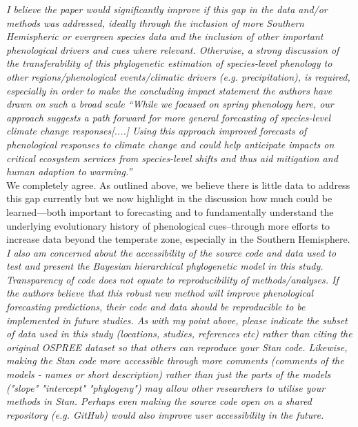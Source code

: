 \documentclass[11pt]{article}
\begin{document}
\emph{I believe the paper would significantly improve if this gap in the data and/or methods was addressed, ideally through the inclusion of more Southern Hemispheric or evergreen species data and the inclusion of other important phenological drivers and cues where relevant. Otherwise, a strong discussion of the transferability of this phylogenetic estimation of species-level phenology to other regions/phenological events/climatic drivers (e.g. precipitation), is required, especially in order to make the concluding impact statement the authors have drawn on such a broad scale “While we focused on spring phenology here, our approach suggests a path forward for more general forecasting of species-level climate change responses[....] Using this approach improved forecasts of phenological responses to climate change and could help anticipate impacts on critical ecosystem services from species-level shifts and thus aid mitigation and human adaption to warming.”}\\

We completely agree. As outlined above, we believe there is little data to address this gap currently but we now highlight in the discussion how much could be learned---both important to forecasting and to fundamentally understand the underlying evolutionary history of phenological cues--through more efforts to increase data beyond the temperate zone, especially in the Southern Hemisphere. \\

\emph{I also am concerned about the accessibility of the source code and data used to test and present the Bayesian hierarchical phylogenetic model in this study. Transparency of code does not equate to reproducibility of methods/analyses. If the authors believe that this robust new method will improve phenological forecasting predictions, their code and data should be reproducible to be implemented in future studies. As with my point above, please indicate the subset of data used in this study (locations, studies, references etc) rather than citing the original OSPREE dataset so that others can reproduce your Stan code. Likewise, making the Stan code more accessible through more comments (comments of the models - names or short description) rather than just the parts of the models ("slope" "intercept" "phylogeny") may allow other researchers to utilise your methods in Stan. Perhaps even making the source code open on a shared repository (e.g. GitHub) would also improve user accessibility in the future.}\\
\end{document}
